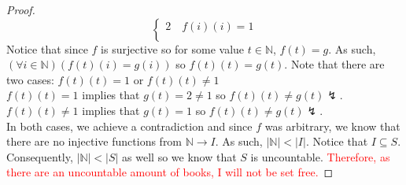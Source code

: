 \documentclass{article}
\newcommand{\naturals}{\mathbb{N}}
\begin{document}
\begin{enumerate}
\begin{proof}
\[\begin{cases}
            2 \quad f(i)(i)=1\\
        \end{cases}
        \]
        Notice that since $f$ is surjective so for some value $t \in \naturals$, $f(t)=g$. As such, $(\forall i \in \naturals)(f(t)(i)=g(i))$ so $f(t)(t)=g(t)$. Note that there are two cases: $f(t)(t)=1$ or $f(t)(t)\neq1$\\
        $f(t)(t)=1$ implies that $g(t)=2\neq1$ so $f(t)(t)\neq g(t) \lightning$.\\
        $f(t)(t)\neq1$ implies that $g(t)=1$ so $f(t)(t)\neq g(t) \lightning$.\\
        In both cases, we achieve a contradiction and since $f$  was arbitrary, we know that there are no injective functions from $\naturals\to I$. As such, $|\naturals|<|I|$. Notice that $I \subseteq S$. Consequently, $|\naturals|<|S|$ as well so we know that $S$ is uncountable. \textcolor{red}{Therefore, as there are an uncountable amount of books, I will not be set free.}
    \end{proof}
\end{enumerate}
\end{document}
